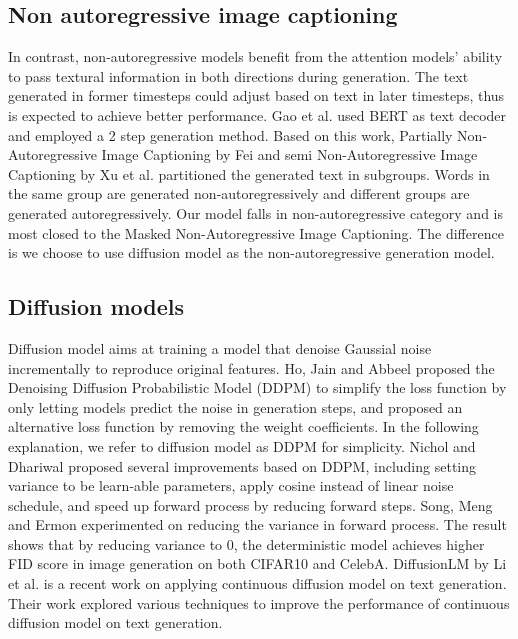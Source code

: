 \documentclass{article}
\begin{document}
\subsection{Non autoregressive image captioning}
In contrast, non-autoregressive models benefit from the attention models' ability to pass textural information in both directions during generation. The text generated in former timesteps could adjust based on text in later timesteps, thus is expected to achieve better performance. Gao et al.\cite{masked-non-autoregres} used BERT\cite{bert} as text decoder and employed a 2 step generation method. Based on this work, Partially Non-Autoregressive Image Captioning by Fei \cite{partial-autoregressive} and semi Non-Autoregressive Image Captioning by Xu et al. \cite{semi-autoregressive} partitioned the generated text in subgroups. Words in the same group are generated non-autoregressively and different groups are generated autoregressively. Our model falls in non-autoregressive category and is most closed to the Masked Non-Autoregressive Image Captioning\cite{masked-non-autoregres}. The difference is we choose to use diffusion model as the non-autoregressive generation model.

\subsection{Diffusion models}
Diffusion model aims at training a model that denoise Gaussial noise incrementally to reproduce original features. Ho, Jain and Abbeel\cite{ddpm} proposed the Denoising Diffusion Probabilistic Model (DDPM) to simplify the loss function by only letting models predict the noise in generation steps, and proposed an alternative loss function by removing the weight coefficients. In the following explanation, we refer to diffusion model as DDPM for simplicity. Nichol and Dhariwal\cite{improved-ddpm} proposed several improvements based on DDPM, including setting variance to be learn-able parameters, apply cosine instead of linear noise schedule, and speed up forward process by reducing forward steps. Song, Meng and Ermon\cite{ddim} experimented on reducing the variance in forward process. The result shows that by reducing variance to 0, the deterministic model achieves higher FID score in image generation on both CIFAR10 and CelebA. DiffusionLM by Li et al. \cite{diffuselm} is a recent work on applying continuous diffusion model on text generation. Their work explored various techniques to improve the performance of continuous diffusion model on text generation. 
\end{document}
